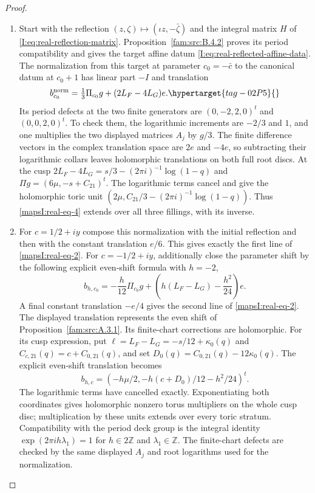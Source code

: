 \begin{proof}
\begin{enumerate}[label=\arabic*.,leftmargin=*]
\item Start with the reflection $(z,\zeta)\mapsto(\iota z,-\bar\zeta)$
and the integral matrix $H$ of \eqref{I:eq:real-reflection-matrix}.
Proposition~\ref{fam:src:B.4.2} proves its period compatibility and gives
the target affine datum \eqref{I:eq:real-reflected-affine-data}.
The normalization from this
target at parameter $c_0=-\bar c$ to the canonical datum at $c_0+1$
has linear part $-I$ and translation
\begin{equation}
 b^{\rm norm}_{c_0}=\tfrac13\Pi_{c_0}g+(2L_F-4L_G)e.
 \hypertarget{tag-02P5}{}\label{mapsI:real-eq-4}
\end{equation}
Its period defects at the two finite generators are
$(0,-2,2,0)^t$ and $(0,0,2,0)^t$. To check them, the logarithmic increments
are $-2/3$ and $1$, and one multiplies the two displayed matrices $A_j$
by $g/3$. The finite difference vectors in the complex translation space are $2e$ and $-4e$, so subtracting
their logarithmic collars leaves holomorphic translations on both full
root discs. At the cusp
$2L_F-4L_G=s/3-(2\pi i)^{-1}\log(1-q)$ and
$\Pi g=(6\mu,-s+C_{21})^t$. The logarithmic terms cancel and give the
holomorphic toric unit
$(2\mu,C_{21}/3-(2\pi i)^{-1}\log(1-q))$.
Thus \eqref{mapsI:real-eq-4} extends over all three fillings, with its inverse.

\item For $c=1/2+iy$ compose this normalization with the initial reflection
and then with the constant translation $e/6$. This gives exactly the
first line of \eqref{mapsI:real-eq-2}. For $c=-1/2+iy$, additionally close the parameter
shift by the following explicit even-shift formula with $h=-2$,
\[
 b_{h,c_0}=-\frac h{12}\Pi_{c_0}g+
 \left(h(L_F-L_G)-\frac{h^2}{24}\right)e.
\]
A final constant translation $-e/4$ gives the second line of \eqref{mapsI:real-eq-2}.
The displayed translation represents the even shift of Proposition~\ref{fam:src:A.3.1}. Its finite-chart corrections are holomorphic. For its cusp expression, put $\ell=L_F-L_G=-s/12+\kappa_0(q)$ and
$C_{c,21}(q)=c+C_{0,21}(q)$, and set
$D_0(q)=C_{0,21}(q)-12\kappa_0(q)$.
The explicit even-shift translation becomes
\[
 b_{h,c}=
 \left(-h\mu/2,-h(c+D_0)/12-h^2/24\right)^t.
\]
The logarithmic terms have cancelled exactly. Exponentiating both
coordinates gives holomorphic nonzero torus multipliers on the whole cusp
disc; multiplication by these units extends over every toric stratum.
Compatibility with the period deck group is the integral identity
$\exp(2\pi i h\lambda_1)=1$ for $h\in2\mathbb Z$ and
$\lambda_1\in\mathbb Z$. The finite-chart defects are checked by the
same displayed $A_j$ and root logarithms used for the normalization.


\end{enumerate}
\end{proof}
